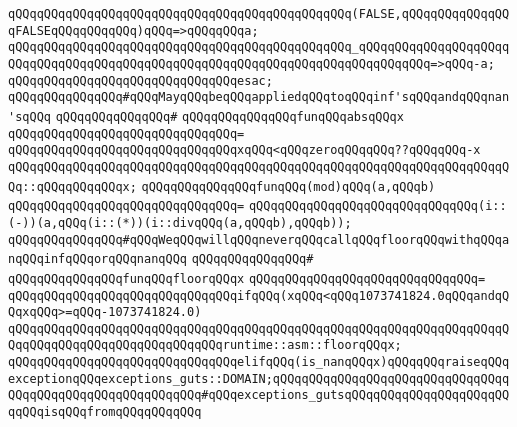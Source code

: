 \verb|qQQqqQQqqQQqqQQqqQQqqQQqqQQqqQQqqQQqqQQqqQQqqQQq(FALSE,qQQqqQQqqQQqqQQqFALSEqQQqqQQqqQQq)qQQq=>qQQqqQQqa;|\newline
\verb|qQQqqQQqqQQqqQQqqQQqqQQqqQQqqQQqqQQqqQQqqQQqqQQq_qQQqqQQqqQQqqQQqqQQqqQQqqQQqqQQqqQQqqQQqqQQqqQQqqQQqqQQqqQQqqQQqqQQqqQQqqQQqqQQq=>qQQq-a;|\newline
\verb|qQQqqQQqqQQqqQQqqQQqqQQqqQQqqQQqesac;|\newline
\newline
\newline
\verb|qQQqqQQqqQQqqQQq#qQQqMayqQQqbeqQQqappliedqQQqtoqQQqinf'sqQQqandqQQqnan'sqQQq|\newline
\verb|qQQqqQQqqQQqqQQq#|\newline
\verb|qQQqqQQqqQQqqQQqfunqQQqabsqQQqx|\newline
\verb|qQQqqQQqqQQqqQQqqQQqqQQqqQQqqQQq=|\newline
\verb|qQQqqQQqqQQqqQQqqQQqqQQqqQQqqQQqxqQQq<qQQqzeroqQQqqQQq??qQQqqQQq-x|\newline
\verb|qQQqqQQqqQQqqQQqqQQqqQQqqQQqqQQqqQQqqQQqqQQqqQQqqQQqqQQqqQQqqQQqqQQqqQQq::qQQqqQQqqQQqx;|\newline
\newline
\verb|qQQqqQQqqQQqqQQqfunqQQq(mod)qQQq(a,qQQqb)|\newline
\verb|qQQqqQQqqQQqqQQqqQQqqQQqqQQqqQQq=|\newline
\verb|qQQqqQQqqQQqqQQqqQQqqQQqqQQqqQQq(i::(-))(a,qQQq(i::(*))(i::divqQQq(a,qQQqb),qQQqb));|\newline
\newline
\verb|qQQqqQQqqQQqqQQq#qQQqWeqQQqwillqQQqneverqQQqcallqQQqfloorqQQqwithqQQqanqQQqinfqQQqorqQQqnanqQQq|\newline
\verb|qQQqqQQqqQQqqQQq#|\newline
\verb|qQQqqQQqqQQqqQQqfunqQQqfloorqQQqx|\newline
\verb|qQQqqQQqqQQqqQQqqQQqqQQqqQQqqQQq=|\newline
\verb|qQQqqQQqqQQqqQQqqQQqqQQqqQQqqQQqifqQQq(xqQQq<qQQq1073741824.0qQQqandqQQqxqQQq>=qQQq-1073741824.0)|\newline
\verb|qQQqqQQqqQQqqQQqqQQqqQQqqQQqqQQqqQQqqQQqqQQqqQQqqQQqqQQqqQQqqQQqqQQqqQQqqQQqqQQqqQQqqQQqqQQqqQQqqQQqruntime::asm::floorqQQqx;|\newline
\verb|qQQqqQQqqQQqqQQqqQQqqQQqqQQqqQQqelifqQQq(is_nanqQQqx)qQQqqQQqraiseqQQqexceptionqQQqexceptions_guts::DOMAIN;qQQqqQQqqQQqqQQqqQQqqQQqqQQqqQQqqQQqqQQqqQQqqQQqqQQqqQQqqQQq#qQQqexceptions_gutsqQQqqQQqqQQqqQQqqQQqqQQqqQQqisqQQqfromqQQqqQQqqQQq|\newline
